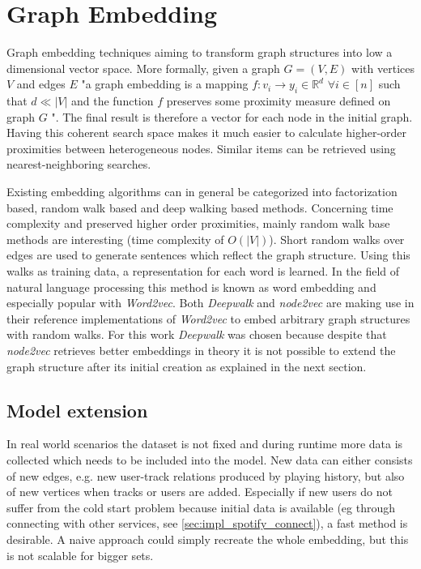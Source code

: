 \documentclass[a4paper]{llncs}
\begin{document}
	
	\section{Graph Embedding}
	Graph embedding techniques aiming to transform graph structures into low a dimensional vector space. More formally, given a graph $ G = (V,E) $ with vertices $ V $ and edges $ E $ "a graph embedding is a mapping $ f : v_{i} \rightarrow y_{i} \in \mathbb{R}^{d} $ $ \forall i \in [n] $ such that $ d \ll |V| $ and the function $ f $ preserves some proximity measure defined on graph $ G $ "\cite{goyal2017graph}. The final result is therefore a vector for each node in the initial graph. Having this coherent search space makes it much easier to calculate higher-order proximities between heterogeneous nodes. Similar items can be retrieved using nearest-neighboring searches.
	
	Existing embedding algorithms can in general be categorized into factorization based, random walk based and deep walking based methods. Concerning time complexity and preserved higher order proximities, mainly random walk base methods are interesting (time complexity of $ O(|V|) $). Short random walks over edges are used to generate sentences which reflect the graph structure. Using this walks as training data, a representation for each word is learned. In the field of natural language processing this method is known as word embedding and especially popular with \emph{Word2vec}\cite{mikolov2013efficient}. Both \emph{Deepwalk}\cite{perozzi2014deepwalk} and \emph{node2vec}\cite{grover2016node2vec} are making use in their reference implementations of \emph{Word2vec} to embed arbitrary graph structures with random walks. For this work \emph{Deepwalk} was chosen because despite that \emph{node2vec} retrieves better embeddings in theory it is not possible to extend the graph structure after its initial creation as explained in the next section.
	
	\subsection{Model extension}
	In real world scenarios the dataset is not fixed and during runtime more data is collected which needs to be included into the model. New data can either consists of new edges, e.g. new user-track relations produced by playing history, but also of new vertices when tracks or users are added. Especially if new users do not suffer from the cold start problem because initial data is available (eg through connecting with other services, see \ref{sec:impl_spotify_connect}), a fast method is desirable. A naive approach could simply recreate the whole embedding, but this is not scalable for bigger sets. 
	
\end{document}
